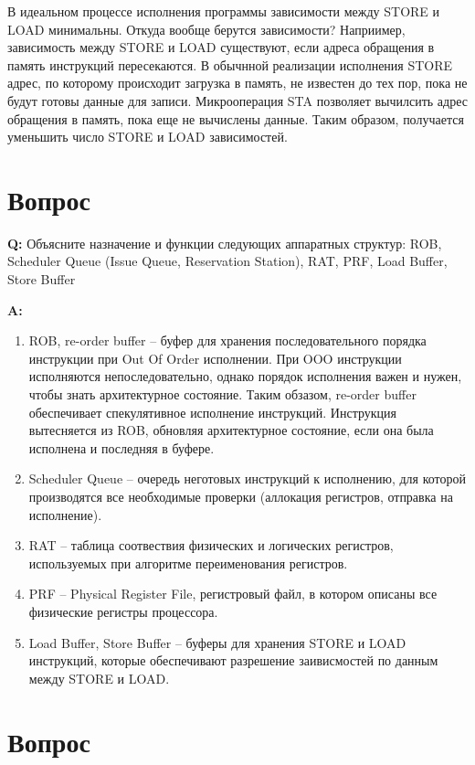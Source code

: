 \documentclass[12pt, letterpaper]{article}
\begin{document}
В идеальном процессе исполнения программы зависимости между STORE и LOAD минимальны. Откуда вообще берутся зависимости? Наприимер, зависимость между STORE и LOAD
существуют, если адреса обращения в память инструкций пересекаются. В обычнной реализации исполнения STORE адрес, по которому происходит загрузка в память, не известен до тех пор, пока не будут готовы данные для записи.
Микрооперация STA позволяет вычилсить адрес обращения в память, пока еще не вычислены данные. Таким образом, получается уменьшить число STORE и LOAD зависимостей.

\newpage

\section{Вопрос}

\textbf{Q: } Объясните назначение и функции следующих аппаратных структур:
ROB, Scheduler Queue (Issue Queue, Reservation Station), RAT, PRF, Load Buffer, Store Buffer

\textbf{A: }

\begin{enumerate}
    \item ROB, re-order buffer -- буфер для хранения последовательного порядка инструкции при Out Of Order исполнении.
    При OOO инструкции исполняются непоследовательно, однако порядок исполнения важен и нужен, чтобы знать архитектурное состояние. Таким обзазом, re-order buffer обеспечивает спекулятивное исполнение инструкций. Инструкция вытесняется из ROB, обновляя архитектурное состояние, если она была исполнена и последняя в буфере.
    \item Scheduler Queue --  очередь неготовых инструкций к исполнению, для которой производятся все необходимые проверки (аллокация регистров, отправка на исполнение).
    \item RAT -- таблица соотвествия физических и логических регистров, используемых при алгоритме переименования регистров.
    \item PRF -- Physical Register File, регистровый файл, в котором описаны все физические регистры процессора.
    \item Load Buffer, Store Buffer -- буферы для хранения STORE и LOAD инструкций, которые обеспечивают разрешение заивисмостей по данным между STORE и LOAD.
\end{enumerate}

\newpage

\section{Вопрос}
\end{document}
